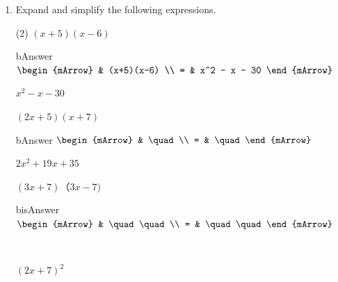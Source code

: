 \clearpage\noindent
\begin{enumerate}[resume]	
  \item Expand and simplify the following expressions.
  \begin{subtask}(2)
    \task[]  $ (x+5)(x-6)  $
              \begin{envOut}[height=6cm]{bAnswer}
			       $\begin{mArrow}
			                & (x+5)(x-6)       \\ 
                          = & x^2 - x - 30  
	                \end{mArrow}$
              \end{envOut}			  
			  \begin{exercise}\begin{shortsolution}  
				       $x^2 - x - 30$
			  \end{shortsolution}\end{exercise}
    \task[]  $ (2x+5)(x+7)  $
              \begin{envOut}[height=6cm]{bAnswer}
			       $\begin{mArrow}
			                & \quad       \\ 
                          = & \quad  
	                \end{mArrow}$
              \end{envOut}			  
			  \begin{exercise}\begin{shortsolution}  
				       $2x^2 + 19x + 35$
			  \end{shortsolution}\end{exercise}
    \task[]  $ (3x+7)（3x-7)  $
              \begin{envOut}[height=6cm]{bisAnswer}
			       $\begin{mArrow}
			                & \quad\quad       \\ 
                          = & \quad\quad  
	                \end{mArrow}$
              \end{envOut}			  
			  \begin{exercise}\begin{shortsolution}  
				       $ \quad $
			  \end{shortsolution}\end{exercise}   			  
    \task[]  $ (2x+7)^2  $
\end{subtask}
\end{enumerate}
